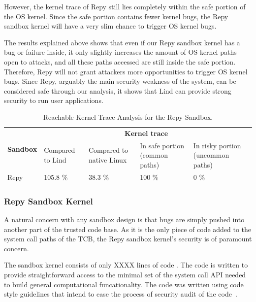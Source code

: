 However, the kernel trace of Repy still lies completely within the safe
portion of the OS kernel. 
Since the safe portion contains fewer kernel bugs, the Repy sandbox kernel
will have a very slim chance to trigger OS kernel bugs.

The results explained above shows that even if our Repy sandbox kernel has a
bug or failure inside, 
it only slightly increases the amount of OS kernel paths open to attacks,
and all these paths accessed are still inside the safe portion. 
Therefore, Repy will not grant attackers more opportunities to trigger OS
kernel bugs. 
Since Repy, arguably the main security weakness of the system, can be
considered safe through our analysis, 
it shows that Lind can provide strong security to run user applications.

\begin{table}
\centering
\scriptsize
\caption{Reachable Kernel Trace Analysis for the Repy Sandbox. }
\begin{tabular}{|l|l|l|l|l|}
  \hline
  \multirow{3}{.8cm}{\bf Sandbox} & \multicolumn{4}{c|}{\bf Kernel trace} \\ \cline{2-5}
  & \multirow{2}{1cm}{Compared to Lind} & 
  \multirow{2}{1.3cm}{Compared to native Linux} & \multirow{2}{1.7cm}{In safe portion 
  (common paths)} & \multirow{2}{1.9cm}{In risky portion (uncommon paths)} \\
  & & & & \\  \hline
  
  Repy & 105.8 \% & 38.3 \% & 100 \%  & 0 \%  \\
  \hline
\end{tabular}
\label{table:trace-Repy}
\end{table}


\subsubsection{Repy Sandbox Kernel}
\label{Sandbox-Kernel-Bugs}

A natural concern with any sandbox design is that bugs are simply pushed into
another part of the trusted code base.  As it is the only piece of code added
to the system call paths of the TCB, the Repy sandbox kernel's security is of
paramount concern.

The sandbox kernel consists of only XXXX lines of code .
The code is written to provide straightforward access to the minimal set
of the system call API needed to build general computational funcationality.
The code was written using code style guidelines that intend to ease the
process of security audit of the code~\cite{style}.

